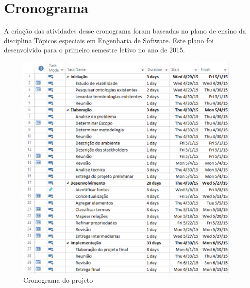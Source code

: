 \section{Cronograma}
A criação das atividades desse cronograma foram baseadas no plano de ensino da disciplina Tópicos especiais em Engenharia de Software. Este plano foi desenvolvido para o primeiro semestre letivo no ano de 2015.

 \begin{figure}[ht]
  \centering
    \includegraphics[keepaspectratio=true,scale=0.5]{figuras/cronograma.eps}
  \caption{Cronograma do projeto}
\end{figure}